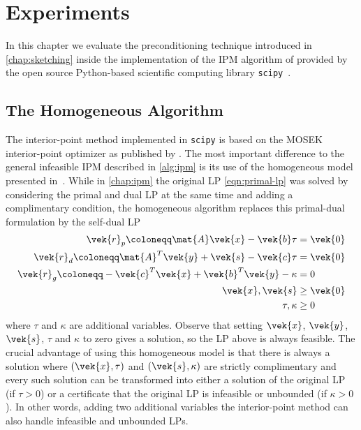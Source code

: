 \chapter{Experiments}\label{chap:experiments}

In this chapter we evaluate the preconditioning technique introduced in \cref{chap:sketching} inside the implementation of the IPM algorithm of \textcite{AndersenAndersen-MosekInteriorPointMethod} provided by the open source Python-based scientific computing library \texttt{scipy}~\cite{Scipy}.

\section{The Homogeneous Algorithm}

The interior-point method implemented in \texttt{scipy} is based on the MOSEK interior-point optimizer as published by \textcite{AndersenAndersen-MosekInteriorPointMethod}.
The most important difference to the general infeasible IPM described in \cref{alg:ipm} is its use of the homogeneous model presented in~\cite{XuHungYe-SimplifiedHomogeneousAlgorithm}.
While in \cref{chap:ipm} the original LP \cref{eqn:primal-lp} was solved by considering the primal and dual LP at the same time and adding a complimentary condition, the homogeneous algorithm replaces this primal-dual formulation by the self-dual LP
\begin{subequations}
  \begin{align}
    \vek{r}_p \coloneqq \mat{A}\vek{x} - \vek{b} \tau &= \vek{0} \\
    \vek{r}_d \coloneqq \mat{A}^T \vek{y} + \vek{s} - \vek{c}\tau &= \vek{0} \\
    \vek{r}_g \coloneqq - \vek{c}^T\vek{x} + \vek{b}^T\vek{y} - \kappa &= 0 \\
    \vek{x}, \vek{s} &\geq \vek{0} \\
    \tau, \kappa &\geq 0
  \end{align}
\end{subequations}
where \(\tau\) and \(\kappa\) are additional variables.
Observe that setting \(\vek{x}\), \(\vek{y}\), \(\vek{s}\), \(\tau\) and \(\kappa\) to zero gives a solution, so the LP above is always feasible.
The crucial advantage of using this homogeneous model is that there is always a solution where \((\vek{x}, \tau)\) and \((\vek{s}, \kappa)\) are strictly complimentary and every such solution can be transformed into either a solution of the original LP (if \(\tau > 0\)) or a certificate that the original LP is infeasible or unbounded (if \(\kappa > 0\)).
In other words, adding two additional variables the interior-point method can also handle infeasible and unbounded LPs.

